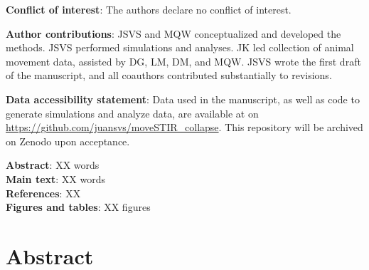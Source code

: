 \documentclass[letterpaper]{article}
\begin{document}
\noindent
\textbf{Conflict of interest}: The authors declare no conflict of interest.

\bigskip
\noindent
\textbf{Author contributions}: JSVS and MQW conceptualized and developed the methods. JSVS performed simulations and analyses. JK led collection of animal movement data, assisted by DG, LM, DM, and MQW. JSVS wrote the first draft of the manuscript, and all coauthors contributed substantially to revisions. 

\bigskip
\noindent
\textbf{Data accessibility statement}: Data used in the manuscript, as well as code to generate simulations and analyze data, are available at on \url{https://github.com/juansvs/moveSTIR_collapse}. This repository will be archived on Zenodo upon acceptance.

\bigskip
\noindent
\textbf{Abstract}: XX words\\
\textbf{Main text}:  XX words\\
\textbf{References}: XX \\
\textbf{Figures and tables}: XX figures 

\newpage

\doublespacing
\linenumbers

\section*{Abstract} %
\end{document}
